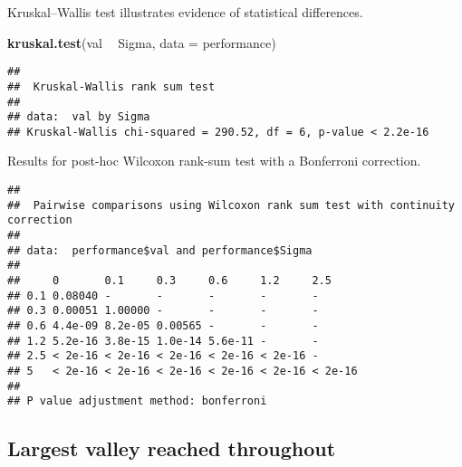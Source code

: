 \documentclass[]{book}
\newenvironment{Shaded}{\begin{snugshade}}{\end{snugshade}}
\newcommand{\DataTypeTok}[1]{\textcolor[rgb]{0.13,0.29,0.53}{#1}}
\newcommand{\KeywordTok}[1]{\textcolor[rgb]{0.13,0.29,0.53}{\textbf{#1}}}
\newcommand{\NormalTok}[1]{#1}
\newcommand{\OperatorTok}[1]{\textcolor[rgb]{0.81,0.36,0.00}{\textbf{#1}}}
\newcommand{\OtherTok}[1]{\textcolor[rgb]{0.56,0.35,0.01}{#1}}
\newcommand{\StringTok}[1]{\textcolor[rgb]{0.31,0.60,0.02}{#1}}
\begin{document}
Kruskal--Wallis test illustrates evidence of statistical differences.

\begin{Shaded}
\begin{Highlighting}[]
\KeywordTok{kruskal.test}\NormalTok{(val }\OperatorTok{~}\StringTok{ }\NormalTok{Sigma, }\DataTypeTok{data =}\NormalTok{ performance)}
\end{Highlighting}
\end{Shaded}

\begin{verbatim}
## 
##  Kruskal-Wallis rank sum test
## 
## data:  val by Sigma
## Kruskal-Wallis chi-squared = 290.52, df = 6, p-value < 2.2e-16
\end{verbatim}

Results for post-hoc Wilcoxon rank-sum test with a Bonferroni correction.

\begin{Shaded}
\end{Shaded}

\begin{verbatim}
## 
##  Pairwise comparisons using Wilcoxon rank sum test with continuity correction 
## 
## data:  performance$val and performance$Sigma 
## 
##     0       0.1     0.3     0.6     1.2     2.5    
## 0.1 0.08040 -       -       -       -       -      
## 0.3 0.00051 1.00000 -       -       -       -      
## 0.6 4.4e-09 8.2e-05 0.00565 -       -       -      
## 1.2 5.2e-16 3.8e-15 1.0e-14 5.6e-11 -       -      
## 2.5 < 2e-16 < 2e-16 < 2e-16 < 2e-16 < 2e-16 -      
## 5   < 2e-16 < 2e-16 < 2e-16 < 2e-16 < 2e-16 < 2e-16
## 
## P value adjustment method: bonferroni
\end{verbatim}

\hypertarget{largest-valley-reached-throughout-12}{%
\subsection{Largest valley reached throughout}\label{largest-valley-reached-throughout-12}}
\end{document}
